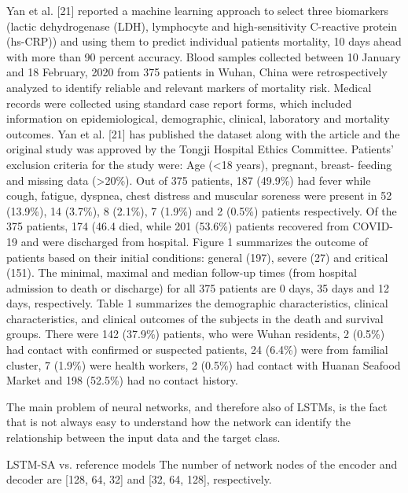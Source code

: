 Yan et al. [21] reported a machine learning approach to select three biomarkers (lactic dehydrogenase (LDH), lymphocyte and high-sensitivity C-reactive protein (hs-CRP)) and using them to predict individual patients mortality, 10 days ahead with more than 90 percent accuracy. 
Blood samples collected between 10 January and 18 February, 2020 from 375 patients in Wuhan, China were retrospectively analyzed to identify reliable and relevant markers of mortality risk. Medical records were collected using standard case report forms, which included information on epidemiological, demographic, clinical, laboratory and mortality outcomes. Yan et al. [21] has published the dataset along with the article and the original study was approved by the Tongji Hospital Ethics Committee. Patients’ exclusion criteria for the study were: Age (<18 years), pregnant, breast- feeding and missing data (>20\%). Out of 375 patients, 187 (49.9\%) had fever while cough, fatigue, dyspnea, chest distress and muscular soreness were present in 52 (13.9\%), 14 (3.7\%), 8 (2.1\%), 7 (1.9\%) and 2 (0.5\%) patients respectively.
Of the 375 patients, 174 (46.4\) died, while 201 (53.6\%) patients recovered from COVID-19 and were discharged from hospital. Figure 1 summarizes the outcome of patients based on their initial conditions: general (197), severe (27) and critical (151). The minimal, maximal and median follow-up times (from hospital admission to death or discharge) for all 375 patients are 0 days, 35 days and 12 days, respectively.
Table 1 summarizes the demographic characteristics, clinical characteristics, and clinical outcomes of the subjects in the death and survival groups. There were 142 (37.9\%) patients, who were Wuhan residents, 2 (0.5\%) had contact with confirmed or suspected patients, 24 (6.4\%) were from familial cluster, 7 (1.9\%) were health workers, 2 (0.5\%) had contact with Huanan Seafood Market and 198 (52.5\%) had no contact history.

The main problem of neural networks, and therefore also of LSTMs, is the fact that is not always easy to understand how the network can identify the relationship between the input data and the target class.

LSTM-SA vs. reference models
The number of network nodes of the encoder and decoder are [128, 64, 32] and [32, 64, 128], respectively.
\fi

